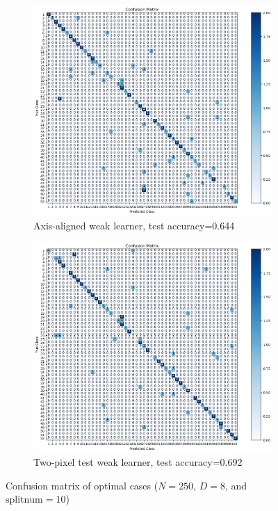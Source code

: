 \begin{figure}[h]
	\centering
	\begin{subfigure}[t]{0.4\linewidth}
		\centering
		\includegraphics[width=\linewidth]{image/q5-fig6.png}
		\caption{Axis-aligned weak learner, test accuracy=0.644}
		\label{fig:q5-fig6}
	\end{subfigure}%
	\quad
	\begin{subfigure}[t]{0.4\linewidth}
		\centering
		\includegraphics[width=\linewidth]{image/q5-fig8.png}
		\caption{Two-pixel test weak learner, test accuracy=0.692}
		\label{fig:q5-fig8}
	\end{subfigure}
	\caption{Confusion matrix of optimal cases ($N=250$, $D=8$, and $\text{splitnum}=10$)}
\end{figure}

